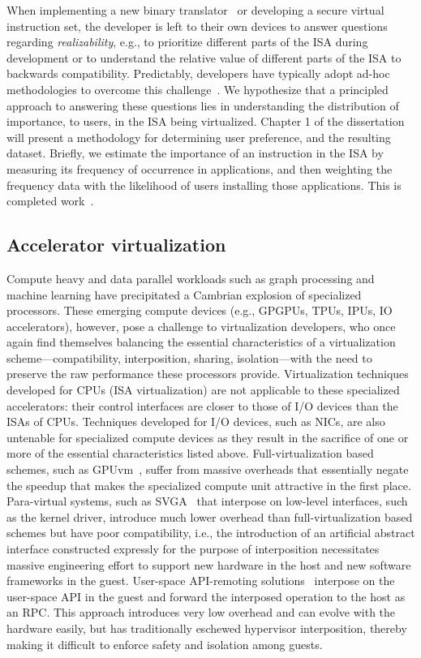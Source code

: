 When implementing a new binary translator~\cite{HVX} or developing a
secure virtual instruction set, the developer is left to
their own devices to answer questions regarding \emph{realizability}, e.g., to
prioritize different parts of the ISA during development or to understand the
relative value of different parts of the ISA to backwards compatibility.
Predictably, developers have typically adopt ad-hoc methodologies to overcome
this challenge~\cite{bugnion-workstation}. We hypothesize that a principled
approach to answering these questions lies in understanding the distribution
of importance, to users, in the ISA being virtualized. Chapter 1 of the
dissertation will present a methodology for determining user preference, and
the resulting dataset.
Briefly, we estimate the importance of an instruction in the ISA by measuring
its frequency of occurrence in applications, and then weighting the frequency
data with the likelihood of users installing those applications. This is
completed work~\cite{x86-systor}.

\subsection{Accelerator virtualization}
Compute heavy and data parallel workloads such as graph processing and machine
learning have precipitated a Cambrian explosion of specialized processors.
These emerging compute devices (e.g., GPGPUs, TPUs, IPUs, IO accelerators),
however, pose a challenge to virtualization developers, who once again find
themselves balancing the essential characteristics of a virtualization
scheme---compatibility, interposition, sharing, isolation---with the need to
preserve the raw performance these processors provide. Virtualization
techniques developed for CPUs (ISA virtualization) are not applicable to these
specialized accelerators: their control interfaces are closer to those of I/O
devices than the ISAs of CPUs.
Techniques developed for I/O devices, such as NICs, are also untenable for
specialized compute devices as they result in the sacrifice of one or more of
the essential characteristics listed above.
Full-virtualization based schemes, such as GPUvm~\cite{suzuki2014gpuvm},
suffer from massive overheads that essentially negate the speedup that makes
the specialized compute unit attractive in the first place.
Para-virtual systems, such as SVGA~\cite{dowty2009gpu} that interpose on
low-level interfaces, such as the kernel driver, introduce much lower overhead
than full-virtualization based schemes but have poor compatibility, i.e., the
introduction of an artificial abstract interface constructed expressly for the
purpose of interposition necessitates massive engineering effort to support
new hardware in the host and new software frameworks in the guest.
User-space API-remoting solutions~\cite{vmCUDA,rCUDA,rCUDAnew} interpose on
the user-space API in the guest and forward the interposed operation to the
host as an RPC. This approach introduces very low overhead and can evolve with
the hardware easily, but has traditionally eschewed hypervisor interposition,
thereby making it difficult to enforce safety and isolation among guests.

